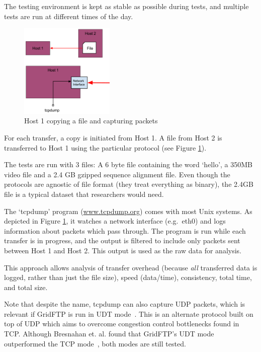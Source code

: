 \documentclass{sig-alternate-05-2015}
\begin{document}
The testing environment is kept as stable as possible during tests, and multiple tests are run at different times of the day.

\begin{figure}[t]
	\centering
	\includegraphics[width=0.4\textwidth]{img/transfer_example.png}
	\caption{Host 1 copying a file and capturing packets
	         \label{fig:copy_example}}
\end{figure}
For each transfer, a copy is initiated from Host 1. A file from Host 2 is transferred to Host 1 using the particular protocol (see Figure \ref{fig:copy_example}).

The tests are run with 3 files: A 6 byte file containing the word `hello', a 350MB video file and a 2.4 GB gzipped sequence alignment file. Even though the protocols are agnostic of file format (they treat everything as binary), the 2.4GB file is a typical dataset that researchers would need.

The `tcpdump' program (\url{www.tcpdump.org}) comes with most Unix systems. As depicted in Figure \ref{fig:copy_example}, it watches a network interface (e.g.\ eth0) and logs information about packets which pass through. The program is run while each transfer is in progress, and the output is filtered to include only packets sent between Host 1 and Host 2. This output is used as the raw data for analysis.

This approach allows analysis of transfer overhead (because \textit{all} transferred data is logged, rather than just the file size), speed (data/time), consistency, total time, and total size.

Note that despite the name, tcpdump can also capture UDP packets, which is relevant if GridFTP is run in UDT mode~\cite{gu2007udt}. This is an alternate protocol built on top of UDP which aims to overcome congestion control bottlenecks found in TCP. Although Bresnahan et. al. found that GridFTP's UDT mode outperformed the TCP mode~\cite{bresnahan2009udt}, both modes are still tested.
\end{document}
